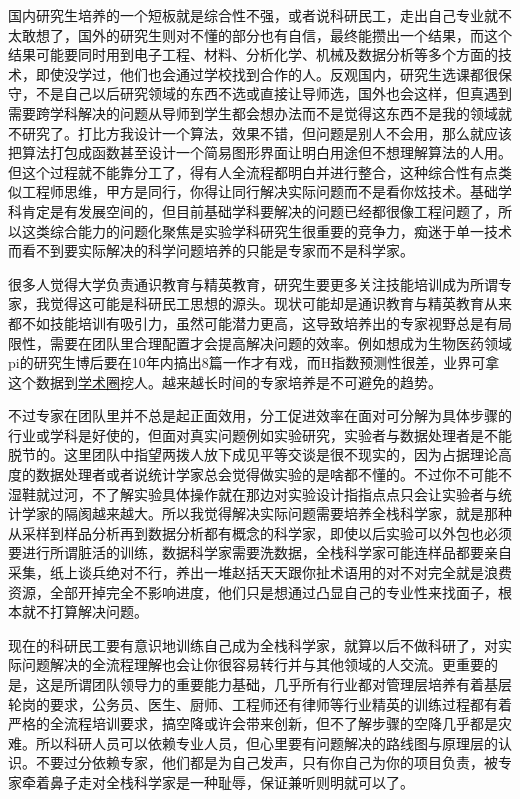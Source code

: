 \documentclass[]{tufte-book}
\begin{document}
国内研究生培养的一个短板就是综合性不强，或者说科研民工，走出自己专业就不太敢想了，国外的研究生则对不懂的部分也有自信，最终能攒出一个结果，而这个结果可能要同时用到电子工程、材料、分析化学、机械及数据分析等多个方面的技术，即使没学过，他们也会通过学校找到合作的人。反观国内，研究生选课都很保守，不是自己以后研究领域的东西不选或直接让导师选，国外也会这样，但真遇到需要跨学科解决的问题从导师到学生都会想办法而不是觉得这东西不是我的领域就不研究了。打比方我设计一个算法，效果不错，但问题是别人不会用，那么就应该把算法打包成函数甚至设计一个简易图形界面让明白用途但不想理解算法的人用。但这个过程就不能靠分工了，得有人全流程都明白并进行整合，这种综合性有点类似工程师思维，甲方是同行，你得让同行解决实际问题而不是看你炫技术。基础学科肯定是有发展空间的，但目前基础学科要解决的问题已经都很像工程问题了，所以这类综合能力的问题化聚焦是实验学科研究生很重要的竞争力，痴迷于单一技术而看不到要实际解决的科学问题培养的只能是专家而不是科学家。

很多人觉得大学负责通识教育与精英教育，研究生要更多关注技能培训成为所谓专家，我觉得这可能是科研民工思想的源头。现状可能却是通识教育与精英教育从来都不如技能培训有吸引力，虽然可能潜力更高，这导致培养出的专家视野总是有局限性，需要在团队里合理配置才会提高解决问题的效率。例如想成为生物医药领域pi的研究生博后要在10年内搞出8篇一作才有戏，而H指数预测性很差，业界可拿这个数据到\href{https://peerj.com/articles/1262/}{学术圈}挖人。越来越长时间的专家培养是不可避免的趋势。

不过专家在团队里并不总是起正面效用，分工促进效率在面对可分解为具体步骤的行业或学科是好使的，但面对真实问题例如实验研究，实验者与数据处理者是不能脱节的。这里团队中指望两拨人放下成见平等交谈是很不现实的，因为占据理论高度的数据处理者或者说统计学家总会觉得做实验的是啥都不懂的。不过你不可能不湿鞋就过河，不了解实验具体操作就在那边对实验设计指指点点只会让实验者与统计学家的隔阂越来越大。所以我觉得解决实际问题需要培养全栈科学家，就是那种从采样到样品分析再到数据分析都有概念的科学家，即使以后实验可以外包也必须要进行所谓脏活的训练，数据科学家需要洗数据，全栈科学家可能连样品都要亲自采集，纸上谈兵绝对不行，养出一堆赵括天天跟你扯术语用的对不对完全就是浪费资源，全部开掉完全不影响进度，他们只是想通过凸显自己的专业性来找面子，根本就不打算解决问题。

现在的科研民工要有意识地训练自己成为全栈科学家，就算以后不做科研了，对实际问题解决的全流程理解也会让你很容易转行并与其他领域的人交流。更重要的是，这是所谓团队领导力的重要能力基础，几乎所有行业都对管理层培养有着基层轮岗的要求，公务员、医生、厨师、工程师还有律师等行业精英的训练过程都有着严格的全流程培训要求，搞空降或许会带来创新，但不了解步骤的空降几乎都是灾难。所以科研人员可以依赖专业人员，但心里要有问题解决的路线图与原理层的认识。不要过分依赖专家，他们都是为自己发声，只有你自己为你的项目负责，被专家牵着鼻子走对全栈科学家是一种耻辱，保证兼听则明就可以了。
\end{document}
